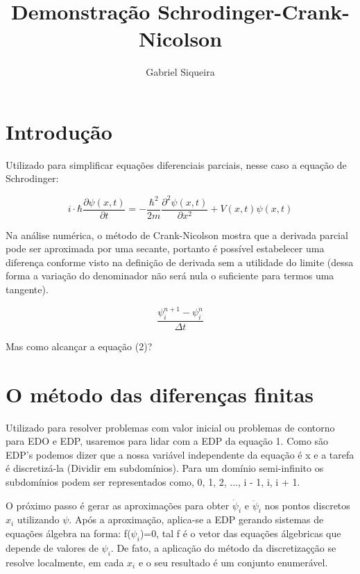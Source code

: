 \documentclass[linenumbers]{aastex631}
\begin{document}
\title{Demonstração Schrodinger-Crank-Nicolson}

\author[0000-0002-2462-9263]{Gabriel Siqueira}

\section{Introdução} \label{sec:intro}

Utilizado para simplificar equações diferenciais parciais, nesse caso a equação de Schrodinger:

\begin{equation}
    i\cdot\hbar\frac{\partial\psi(x,t)}{\partial t}=-\frac{\hbar^2}{2m}\frac{\partial^2\psi(x,t)}{\partial x^2} + V(x,t)\psi(x,t)
\end{equation}

Na análise numérica, o método de Crank-Nicolson mostra que a derivada parcial pode ser aproximada por uma secante, portanto é possível estabelecer uma diferença conforme visto na definição de derivada sem a utilidade do limite (dessa forma a variação do denominador não será nula o suficiente para termos uma tangente).

\begin{equation}
    \frac{\psi^{n+1}_i-\psi^{n}_i}{\Delta t}
\end{equation}

Mas como alcançar a equação (2)?

\section{O método das diferenças finitas}

Utilizado para resolver problemas com valor inicial ou problemas de contorno para EDO e EDP, usaremos para lidar com a EDP da equação 1. Como são EDP's podemos dizer que a nossa variável independente da equação é x e a tarefa é discretizá-la (Dividir em subdomínios). Para um domínio semi-infinito os subdomínios podem ser representados como, 0, 1, 2, ..., i - 1, i, i + 1.

O próximo passo é gerar as aproximações para obter $\dot\psi_i$ e $\ddot\psi_i$ nos pontos discretos $x_i$ utilizando $\psi$. Após a aproximação, aplica-se a EDP gerando sistemas de equações álgebra na forma: f($\psi_i$)=0, tal f é o vetor das equações álgebricas que depende de valores de $\psi_i$. De fato, a aplicação do método da discretizaçção se resolve localmente, em cada $x_i$ e o seu resultado é um conjunto enumerável.
\end{document}
